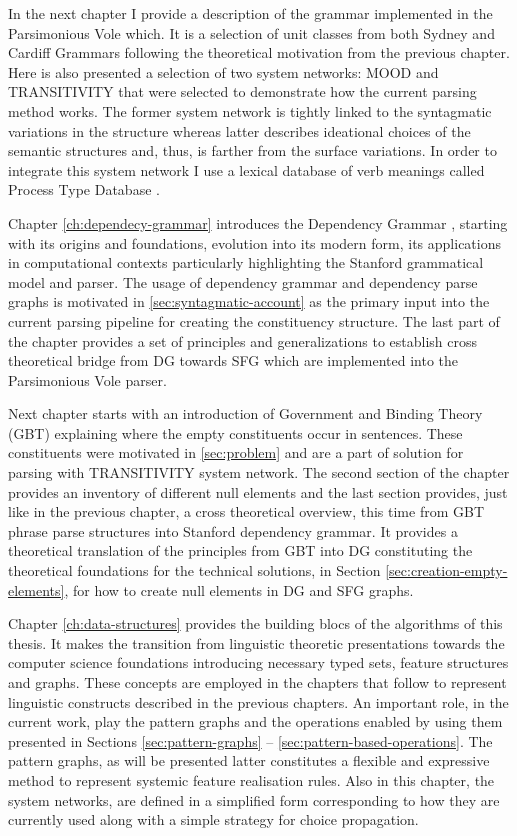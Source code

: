 In the next chapter I provide a description of the grammar implemented in the Parsimonious Vole which. It is a selection of unit classes from both Sydney and Cardiff Grammars following the theoretical motivation from the previous chapter. Here is also presented a selection of two system networks: MOOD and TRANSITIVITY that were selected to demonstrate how the current parsing method works. The former system network is tightly linked to the syntagmatic variations in the structure whereas latter describes ideational choices of the semantic structures and, thus, is farther from the surface variations. In order to integrate this system network I use a lexical database of verb meanings called Process Type Database \citet{Neale2002}. 

Chapter \ref{ch:dependecy-grammar} introduces the Dependency Grammar \citeyear{Tesniere59}, starting with its origins and foundations, evolution into its modern form, its applications in computational contexts particularly highlighting the Stanford grammatical model and parser. The usage of dependency grammar and dependency parse graphs is motivated in \ref{sec:syntagmatic-account} as the primary input into the current parsing pipeline for creating the constituency structure. The last part of the chapter provides a set of principles and generalizations to establish cross theoretical bridge from DG towards SFG which are implemented into the Parsimonious Vole parser. 

Next chapter starts with an introduction of Government and Binding Theory (GBT) explaining where the empty constituents occur in sentences. These constituents were motivated in \ref{sec:problem} and are a part of solution for parsing with TRANSITIVITY system network. The second section of the chapter provides an inventory of different null elements and the last section provides, just like in the previous chapter, a cross theoretical overview, this time from GBT phrase parse structures into Stanford dependency grammar. It provides a theoretical translation of the principles from GBT into DG constituting the theoretical foundations for the technical solutions, in Section \ref{sec:creation-empty-elements}, for how to create null elements in DG and SFG graphs. 


Chapter \ref{ch:data-structures} provides the building blocs of the algorithms of this thesis. It makes the transition from linguistic theoretic presentations towards the computer science foundations introducing necessary typed sets, feature structures and graphs. These concepts are employed in the chapters that follow to represent linguistic constructs described in the previous chapters. An important role, in the current work, play the pattern graphs and the operations enabled by using them presented in Sections \ref{sec:pattern-graphs} -- \ref{sec:pattern-based-operations}. 
The pattern graphs, as will be presented latter constitutes a flexible and expressive method to represent systemic feature realisation rules. Also in this chapter, the system networks, are defined in a simplified form corresponding to how they are currently used along with a simple strategy for choice propagation. 


